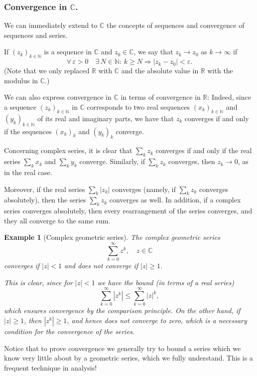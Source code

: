 \documentclass[a4paper,reqno]{amsart}
\numberwithin{equation}{section}
\newtheorem{example}{Example}
\def\C{\mathbb{C}}
\def\N{\mathbb{N}}
\def\R{\mathbb{R}}
\begin{document}
\subsubsection{Convergence in $\C$.}
We can immediately extend to $\C$ the concepts of sequences and convergence of sequences and series.

\noindent
If $(z_k)_{k\in \N}$ is a sequence in $\C$ and $z_0\in \C$, we say that $z_k\to z_0$ as $k\to \infty$ if
$$
\forall\, \varepsilon>0 \quad \exists\, N\in \N: \, k\geq N \Rightarrow |z_k-z_0|<\varepsilon.
$$
(Note that we only replaced $\R$ with $\C$ and the absolute value in $\R$ with the modulus in $\C$.)

\smallskip

We can also express convergence in $\C$ in terms of convergence in $\R$: Indeed, since a sequence $(z_k)_{k\in \N}$ in $\C$ corresponds to two real sequences $(x_k)_{k\in \N}$ and $(y_k)_{k\in \N}$ of its real and imaginary parts, we have that $z_k$ converges if and only if the sequences $(x_k)_k$ and $(y_k)_k$ converge.

\medskip

\noindent
Concerning complex series, it is clear that $\sum_k z_k$ converges if and only if the real series $\sum_k x_k$ and $\sum_k y_k$ converge. Similarly, if $\sum_k z_k$ converges, then $z_k \to 0$, as in the real case. %

Moreover, if the real series $\sum_k |z_k|$ converges (namely, if $\sum_k z_k$ converges absolutely), then the series $\sum_k z_k$ converges as well. In addition, if a complex series converges absolutely, then every rearrangement of the series converges, and they all converge to the same sum.


\begin{example}[Complex geometric series]
The complex geometric series
$$
\sum_{k=0}^\infty z^k, \quad z\in \C
$$
converges if $|z|<1$ and does not converge if $|z|\geq 1$.

This is clear, since for $|z|<1$ we have the bound (in terms of a real series)
$$
\sum_{k=0}^\infty |z^k| \leq \sum_{k=0}^\infty |z|^k,
$$
which ensures convergence by the comparison principle. On the other hand, if $|z|\geq 1$, then $|z^k|\geq 1$, and hence does not converge to zero, which is a necessary condition for the convergence of the series.
\end{example}

Notice that to prove convergence we generally try to bound a series which we
know very little about by a geometric series, which we fully understand. This is a
frequent technique in analysis!
\end{document}
